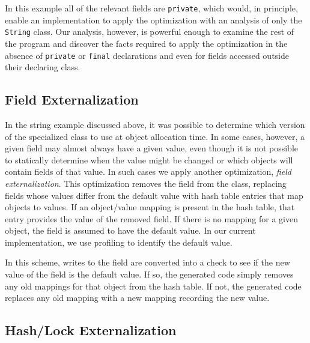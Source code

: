 \documentclass{sig-alt-full}
\begin{document}
In this example all of the relevant fields are {\tt private}, which
would, in principle, enable an implementation to apply the
optimization with an analysis of only the {\tt String} class.  Our
analysis, however, is powerful enough to examine the rest of the
program and discover the facts required to apply the optimization in
the absence of {\tt private} or {\tt final} declarations and even for
fields accessed outside their declaring class.

\subsection{Field Externalization}

In the string example discussed above, it was possible to determine
which version of the specialized class to use at object allocation
time. In some cases, however, a given field may almost always have
a given value, even though it is not possible to statically determine
when the value might be changed or which objects will contain fields of that 
value. In such cases we apply another optimization, 
{\em field externalization}. This optimization removes the field
from the class, replacing fields whose values differ from the default 
value with hash table entries that map objects to values. If an object/value
mapping is present in the hash table, that entry provides the 
value of the removed field. If there is no mapping for a given object,
the field is assumed to have the default value. 
In our current implementation, we use profiling 
to identify the default value. 

In this scheme, writes to the field are converted into a check to see
if the new value of the field is the default value. If so, the 
generated code simply removes any old mappings for that 
object from the hash table.
If not, the generated code replaces any old mapping with a new
mapping recording the new value. 

\subsection{Hash/Lock Externalization}
\end{document}
